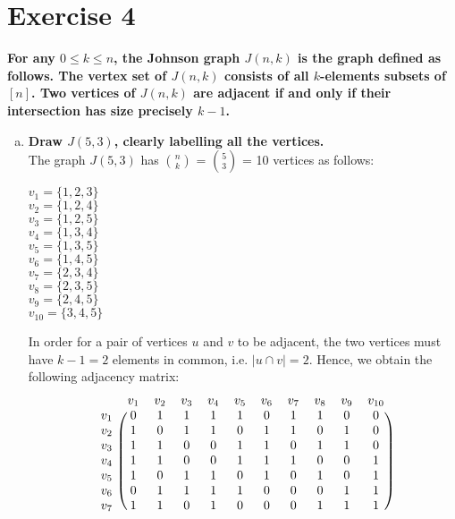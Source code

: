 \section*{Exercise 4}
\boldmath
\textbf{For any $0 \leq k \leq n$, the Johnson graph $J(n, k)$ is the graph defined as follows. The vertex set of
$J(n, k)$ consists of all $k$-elements subsets of $[n]$. Two vertices of $J(n, k)$ are adjacent if and only
if their intersection has size precisely $k-1$.} 
\begin{enumerate}[a)]
    \item \textbf{Draw $J(5, 3)$, clearly labelling all the vertices.} 
    \unboldmath
    \\
    \linebreak 
    The graph $J(5,3)$ has $\binom{n}{k}$ = $\binom{5}{3}$ = 10 vertices as follows: 
    \begin{multicols}{2}
    $v_1 = \{1, 2, 3\}$ \\
    $v_2 = \{1, 2, 4\}$ \\
    $v_3 = \{1, 2, 5\}$ \\
    $v_4 = \{1, 3, 4\}$ \\
    $v_5 = \{1, 3, 5\}$ \\
    $v_6 = \{1, 4, 5\}$ \\
    $v_7 = \{2, 3, 4\}$ \\
    $v_8 = \{2, 3, 5\}$ \\
    $v_9 = \{2, 4, 5\}$ \\
    $v_{10} = \{3, 4, 5\}$ 
    \end{multicols}
    In order for a pair of vertices $u$ and $v$ to be adjacent, the two vertices must have $k-1 = 2$ elements in common, i.e. $|u \cap v| = 2$. Hence, we obtain the following adjacency matrix:
    \[
\begin{blockarray}{ccccccccccc}
& v_1 & v_2 & v_3 & v_4 & v_5 & v_6 & v_7 & v_8 & v_9 & v_{10}\\
\begin{block}{c(cccccccccc)}
  v_1 & 0 & 1 & 1 & 1 & 1 & 0 & 1 & 1 & 0 & 0 \\
  v_2 & 1 & 0 & 1 & 1 & 0 & 1 & 1 & 0 & 1 & 0 \\
  v_3 & 1 & 1 & 0 & 0 & 1 & 1 & 0 & 1 & 1 & 0 \\
  v_4 & 1 & 1 & 0 & 0 & 1 & 1 & 1 & 0 & 0 & 1 \\
  v_5 & 1 & 0 & 1 & 1 & 0 & 1 & 0 & 1 & 0 & 1 \\
  v_6 & 0 & 1 & 1 & 1 & 1 & 0 & 0 & 0 & 1 & 1 \\
  v_7 & 1 & 1 & 0 & 1 & 0 & 0 & 0 & 1 & 1 & 1 \\

\end{block}
\end{blockarray}\]
\end{enumerate}
